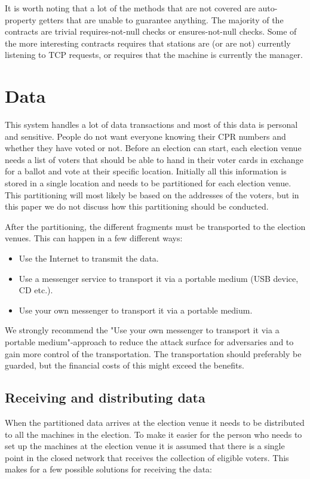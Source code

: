 \documentclass[a4paper]{report}
\begin{document}
It is worth noting that a lot of the methods that are not covered are auto-property getters that are unable to guarantee anything. The majority of the contracts are trivial requires-not-null checks or ensures-not-null checks. Some of the more interesting contracts requires that stations are (or are not) currently listening to TCP requests, or requires that the machine is currently the manager.

\chapter{Data}
\label{sec:data}
This system handles a lot of data transactions and most of this data is personal and sensitive. People do not want everyone knowing their CPR numbers and whether they have voted or not. Before an election can start, each election venue needs a list of voters that should be able to hand in their voter cards in exchange for a ballot and vote at their specific location. Initially all this information is stored in a single location and needs to be partitioned for each election venue. This partitioning will most likely be based on the addresses of the voters, but in this paper we do not discuss how this partitioning should be conducted. 

After the partitioning, the different fragments must be transported to the election venues. This can happen in a few different ways:

\begin{itemize}
\item Use the Internet to transmit the data.
\item Use a messenger service to transport it via a portable medium (USB device, CD etc.).
\item Use your own messenger to transport it via a portable medium.
\end{itemize}

We strongly recommend the "Use your own messenger to transport it via a portable medium"-approach to reduce the attack surface for adversaries and to gain more control of the transportation. The transportation should preferably be guarded, but the financial costs of this might exceed the benefits.

\section{Receiving and distributing data}
\label{sec:RaDdata}
When the partitioned data arrives at the election venue it needs to be distributed to all the machines in the election. To make it easier for the person who needs to set up the machines at the election venue it is assumed that there is a single point in the closed network that receives the collection of eligible voters. This makes for a few possible solutions for receiving the data:
\end{document}

